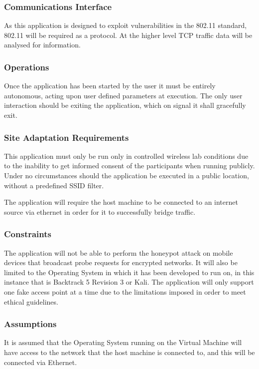 \subsubsection{Communications Interface}
As this application is designed to exploit vulnerabilities in the 802.11 standard, 802.11 will be required as a protocol. At the higher level TCP traffic data will be analysed for information.

\subsubsection{Operations}
Once the application has been started by the user it must be entirely autonomous, acting upon user defined parameters at execution. The only user interaction should be exiting the application, which on signal it shall gracefully exit.

\subsubsection{Site Adaptation Requirements}
This application must only be run only in controlled wireless lab conditions due to the inability to get informed consent of the participants when running publicly. Under no circumstances should the application be executed in a public location, without a predefined SSID filter.

The application will require the host machine to be connected to an internet source via ethernet in order for it to successfully bridge traffic.

\subsubsection{Constraints}
The application will not be able to perform the honeypot attack on mobile devices that broadcast probe requests for encrypted networks. It will also be limited to the Operating System in which it has been developed to run on, in this instance that is Backtrack 5 Revision 3 or Kali. The application will only support one fake access point at a time due to the limitations imposed in order to meet ethical guidelines.

\subsubsection{Assumptions}
It is assumed that the Operating System running on the Virtual Machine will have access to the network that the host machine is connected to, and this will be connected via Ethernet.

